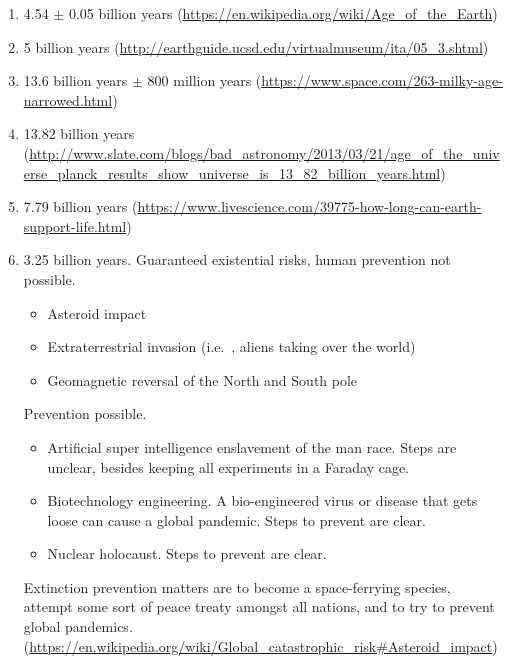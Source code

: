 \documentclass[12pt]{scrartcl}
\begin{document}
\maketitle


\problem{}
\begin{enumerate}[label= (\alph*)]
    \item \num{4.54} $\pm$ \num{0.05} billion years (\url{https://en.wikipedia.org/wiki/Age_of_the_Earth})
    \item \num{5} billion years (\url{http://earthguide.ucsd.edu/virtualmuseum/ita/05_3.shtml})
    \item \num{13.6} billion years $\pm$ \num{800} million years (\url{https://www.space.com/263-milky-age-narrowed.html})
    \item \num{13.82} billion years (\url{http://www.slate.com/blogs/bad_astronomy/2013/03/21/age_of_the_universe_planck_results_show_universe_is_13_82_billion_years.html})
    \item \num{7.79} billion years (\url{https://www.livescience.com/39775-how-long-can-earth-support-life.html})
    \item \num{3.25} billion years. Guaranteed existential risks, human prevention not possible.
        \begin{itemize}
            \item Asteroid impact
            \item Extraterrestrial invasion (i.e.~, aliens taking over the world)
            \item Geomagnetic reversal of the North and South pole
        \end{itemize}

        Prevention possible.
        \begin{itemize}
            \item Artificial super intelligence enslavement of the man race. Steps are unclear, besides keeping all experiments in a Faraday cage.
            \item Biotechnology engineering. A bio-engineered virus or disease that gets loose can cause a global pandemic. Steps to prevent are clear.
            \item Nuclear holocaust. Steps to prevent are clear.
        \end{itemize}

        Extinction prevention matters are to become a space-ferrying species, attempt some sort of peace treaty amongst all nations, and to try to prevent global pandemics. (\url{https://en.wikipedia.org/wiki/Global_catastrophic_risk#Asteroid_impact})


\end{enumerate}
\end{document}
